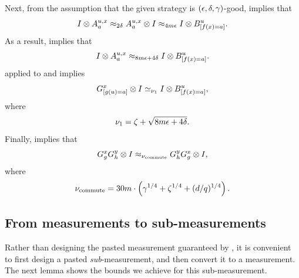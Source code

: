 Next, from the assumption that the given strategy is $(\epsilon,
\delta, \gamma)$-good,  implies that
\begin{equation*}
I \otimes A^{u, x}_a \approx_{2\delta} A^{u, x}_a \otimes I \approx_{4m\epsilon} I \otimes B^{u}_{[f(x)=a]}.
\end{equation*}
As a result,  implies that
\begin{equation}\label{eq:ld-abcon}
I \otimes A^{u, x}_a \approx_{8m\epsilon + 4\delta} I\otimes B^{u}_{[f(x)=a]}.
\end{equation}
 applied to  and  implies
\begin{equation}\label{eq:ld-gbcon}
G^x_{[g(u) = a]} \otimes I \simeq_{\nu_1} I \otimes B^{u}_{[f(x)=a]},
\end{equation}
where
\begin{equation}\label{eq:ld-nu1-def}
\nu_1 = \zeta + \sqrt{8 m\epsilon + 4\delta}.
\end{equation}
Finally,  implies that
\begin{equation}\label{eq:quote-com-main}
G^x_g G^y_h \otimes I \approx_{\nu_{\mathrm{commute}}} G^y_h G^x_g \otimes I,
\end{equation}
where
\begin{equation*}
\nu_{\mathrm{commute}} = 30 m \cdot \left( \gamma^{1/4} +\zeta^{1/4} + (d/q)^{1/4}\right).
\end{equation*}



\subsection{From measurements to sub-measurements}

Rather than designing the pasted measurement guaranteed by ,
it is convenient to first design a pasted \emph{sub}-measurement,
and then convert it to a measurement.
The next lemma shows the bounds we achieve for this sub-measurement.

